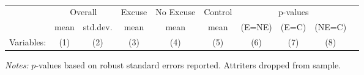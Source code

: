 \begin{table}[!ht]
\centering
\caption{}
\label{}
\vspace*{2mm}
\begin{threeparttable}
\begin{tabular}{lccccccccc}
\toprule
 & \multicolumn{2}{c}{Overall} & Excuse & No Excuse & Control & \multicolumn{3}{c}{p-values} \\
 \cmidrule(r){2-3} \cmidrule(lr){4-4} \cmidrule(lr){5-5} \cmidrule(lr){6-6} \cmidrule(lr){7-9} 
 & mean & std.dev. & mean & mean & mean & (E=NE) & (E=C) & (NE=C) \\
 \cmidrule(r){2-2} \cmidrule(lr){3-3} \cmidrule(lr){4-4} \cmidrule(lr){5-5} \cmidrule(l){6-6} \cmidrule(l){7-7} \cmidrule(l){8-8} \cmidrule(l){9-9}  
  Variables: & (1) & (2) & (3) & (4) & (5) & (6) & (7) & (8) \\ \midrule \midrule
 \midrule
\bottomrule
\end{tabular}
\begin{tablenotes}[flushleft] \footnotesize
\item \textit{Notes: }$p$-values based on robust standard errors reported. Attriters dropped from sample.
\end{tablenotes} \end{threeparttable} \end{table}
